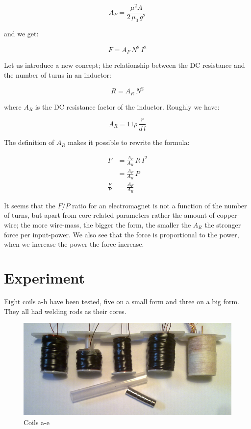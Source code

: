 \documentclass[]{../common/elementary-physics}
\begin{document}
\begin{equation}
A_F = \frac{\mu^2 A}{2 \, \mu_0 \, g^2}
\end{equation}

and we get:

\begin{equation}
F = A_F \, N^2 \, I^2
\end{equation}

Let us introduce a new concept; the relationship between the DC resistance and the number of turns in an inductor:

\begin{equation}
R = A_R \, N^2
\end{equation}

where $A_R$ is the DC resistance factor of the inductor.
Roughly we have:

\begin{equation}
A_R = 11 \rho \, \frac{r}{d \, l}
\end{equation}

The definition of $A_R$ makes it possible to rewrite the formula:

\begin{subequations}
\begin{align}
F &= \frac{A_F}{A_R} \, R \, I^2 \\
&= \frac{A_F}{A_R} \, P \\
\frac{F}{P} &= \frac{A_F}{A_R}
\end{align}
\end{subequations}

It seems that the $F/P$ ratio for an electromagnet is not a function of the number of turns, but apart from core-related parameters rather the amount of copper-wire; the more wire-mass, the bigger the form, the smaller the $A_R$ the stronger force per input-power. We also see that the force is proportional to the power, when we increase the power the force increase.

\pagebreak

\section{Experiment}

Eight coils a-h have been tested, five on a small form and three on a big form.
They all had welding rods as their cores.

\begin{figure}[ht] \centering
	\includegraphics[scale=1.7]{coils-a-e} \caption{Coils a-e}
\end{figure}
\end{document}
